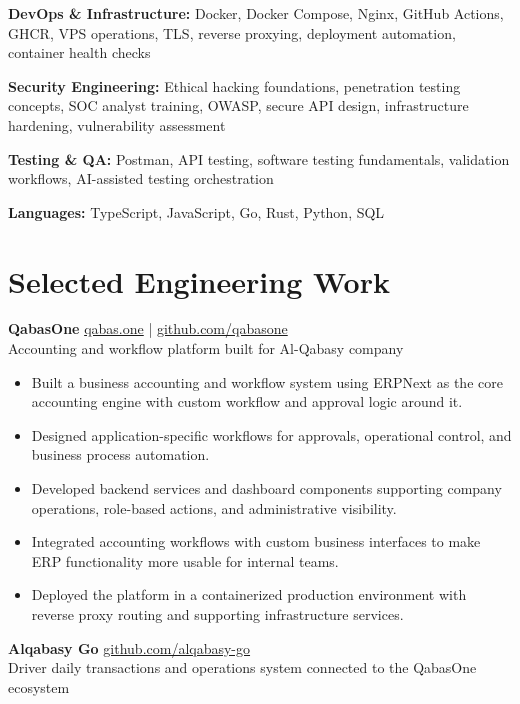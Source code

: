 \documentclass[10pt,a4paper]{article}
\newcommand{\project}[3]{
  \textbf{\color{heading} #1} \hfill {\small \color{muted} #2}\\
  {\small \color{muted} #3}
  \vspace{2pt}
}
\newcommand{\skillgroup}[2]{
  \textbf{\color{heading} #1:} #2\par
}
\begin{document}
\skillgroup{DevOps \& Infrastructure}
{Docker, Docker Compose, Nginx, GitHub Actions, GHCR, VPS operations, TLS, reverse proxying, deployment automation, container health checks}

\skillgroup{Security Engineering}
{Ethical hacking foundations, penetration testing concepts, SOC analyst training, OWASP, secure API design, infrastructure hardening, vulnerability assessment}

\skillgroup{Testing \& QA}
{Postman, API testing, software testing fundamentals, validation workflows, AI-assisted testing orchestration}

\skillgroup{Languages}
{TypeScript, JavaScript, Go, Rust, Python, SQL}

\section*{Selected Engineering Work}

\project
  {QabasOne}
  {\href{https://qabas.one}{qabas.one} \; | \; \href{https://github.com/qabasone}{github.com/qabasone}}
  {Accounting and workflow platform built for Al-Qabasy company}

\begin{itemize}
  \item Built a business accounting and workflow system using ERPNext as the core accounting engine with custom workflow and approval logic around it.
  \item Designed application-specific workflows for approvals, operational control, and business process automation.
  \item Developed backend services and dashboard components supporting company operations, role-based actions, and administrative visibility.
  \item Integrated accounting workflows with custom business interfaces to make ERP functionality more usable for internal teams.
  \item Deployed the platform in a containerized production environment with reverse proxy routing and supporting infrastructure services.
\end{itemize}

\vspace{4pt}

\project
  {Alqabasy Go}
  {\href{https://github.com/alqabasy-go}{github.com/alqabasy-go}}
  {Driver daily transactions and operations system connected to the QabasOne ecosystem}
\end{document}
